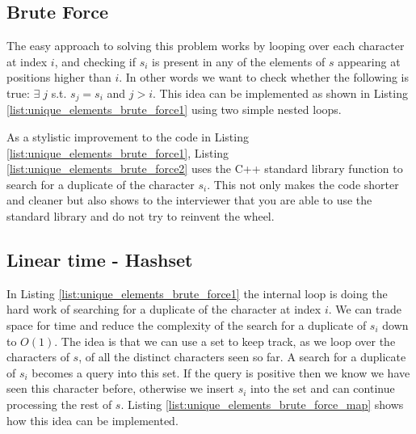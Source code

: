 \subsection{Brute Force}
The easy approach to solving this problem works by looping over each character at index $i$,
and checking if $s_i$ is present in any of the elements  of $s$ appearing at positions higher than $i$. 
In other words we want to check whether the following is true: $\exists \; j $ s.t.  $s_j=s_i$ and $j>i$.
This idea can be implemented as shown in
Listing \ref{list:unique_elements_brute_force1} using two simple nested loops.




As a stylistic improvement to the code in Listing \ref{list:unique_elements_brute_force1}, Listing
\ref{list:unique_elements_brute_force2}  uses the C++ standard library function  to
search for a duplicate of the character $s_i$. 
This not only makes the code shorter and cleaner
but also shows to the interviewer that you are able to use the standard library and do not try to reinvent the wheel.



\subsection{Linear time - Hashset}
In Listing \ref{list:unique_elements_brute_force1} the internal loop is doing the hard work of
searching for a duplicate of the character at index $i$. We can trade space for time and reduce the
complexity of the  search for a duplicate of $s_i$ down to $O(1)$.
The idea is that we can use a set to keep track, as we loop over the characters of $s$, of all the distinct characters seen so far.
A search for a duplicate of $s_i$ becomes a query into this set. If the query is positive then we know we have seen this character before, otherwise 
we insert $s_i$ into the set and can continue  processing the rest of $s$.
Listing \ref{list:unique_elements_brute_force_map} shows how this idea can be implemented.





